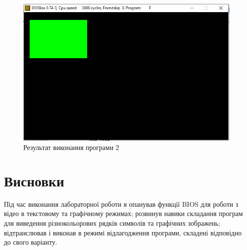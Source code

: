 \documentclass{article}
\begin{document}
\begin{normalsize}
\begin{figure}[H]
	\centering
	\includegraphics[scale=0.7]{3}
	\caption{Результат виконання програми 2}
\end{figure}
		
		\section*{Висновки}
		Під час виконання лабораторної роботи я опанував функції BIOS для роботи з відео в текстовому та графічному режимах; розвинув навики складання програм для виведення різнокольорових рядків символів та графічних зображень; відтранслював і виконав в режимі відлагодження програми, складені відповідно до свого варіанту.
		
	\end{normalsize}
\end{document}
